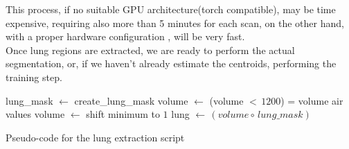 \documentclass{standalone}
\begin{document}
	This process, if no suitable GPU architecture(torch compatible), may be time expensive, requiring also more than 5 minutes for each scan, on the other hand, with a proper hardware configuration , will be very fast.\\
	
	Once lung regions are extracted, we are ready to perform the actual segmentation, or, if we haven't already estimate the centroids, performing the training step.\\
	
	
	\begin{algorithm}
		
		\SetAlgoLined
		\DontPrintSemicolon
		
		
		lung\_mask $\leftarrow$ create\_lung\_mask\;
		volume $\leftarrow$ (volume $<\,1200$) = volume air values\;
		volume $\leftarrow$ shift minimum to $1$\;
		lung $\leftarrow\,(volume\circ\,lung\_mask)$\;		
	\caption{Pseudo-code for the lung extraction script}	\label{alg:lungExtraction}
		
	\end{algorithm}
	
\end{document}
